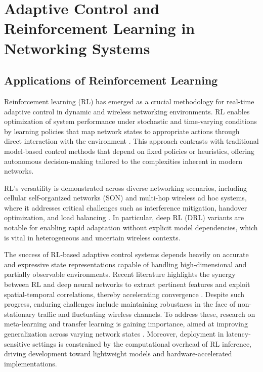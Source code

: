 \section{Adaptive Control and Reinforcement Learning in Networking Systems}

\subsection{Applications of Reinforcement Learning}

Reinforcement learning (RL) has emerged as a crucial methodology for real-time adaptive control in dynamic and wireless networking environments. RL enables optimization of system performance under stochastic and time-varying conditions by learning policies that map network states to appropriate actions through direct interaction with the environment \cite{ref2,ref5,ref7,ref12,ref31,ref32,ref33,ref34,ref35,ref50}. This approach contrasts with traditional model-based control methods that depend on fixed policies or heuristics, offering autonomous decision-making tailored to the complexities inherent in modern networks.

RL's versatility is demonstrated across diverse networking scenarios, including cellular self-organized networks (SON) and multi-hop wireless ad hoc systems, where it addresses critical challenges such as interference mitigation, handover optimization, and load balancing \cite{ref31,ref32,ref33,ref34,ref35}. In particular, deep RL (DRL) variants are notable for enabling rapid adaptation without explicit model dependencies, which is vital in heterogeneous and uncertain wireless contexts.

The success of RL-based adaptive control systems depends heavily on accurate and expressive state representations capable of handling high-dimensional and partially observable environments. Recent literature highlights the synergy between RL and deep neural networks to extract pertinent features and exploit spatial-temporal correlations, thereby accelerating convergence \cite{ref31,ref32,ref33}. Despite such progress, enduring challenges include maintaining robustness in the face of non-stationary traffic and fluctuating wireless channels. To address these, research on meta-learning and transfer learning is gaining importance, aimed at improving generalization across varying network states \cite{ref35}. Moreover, deployment in latency-sensitive settings is constrained by the computational overhead of RL inference, driving development toward lightweight models and hardware-accelerated implementations.

